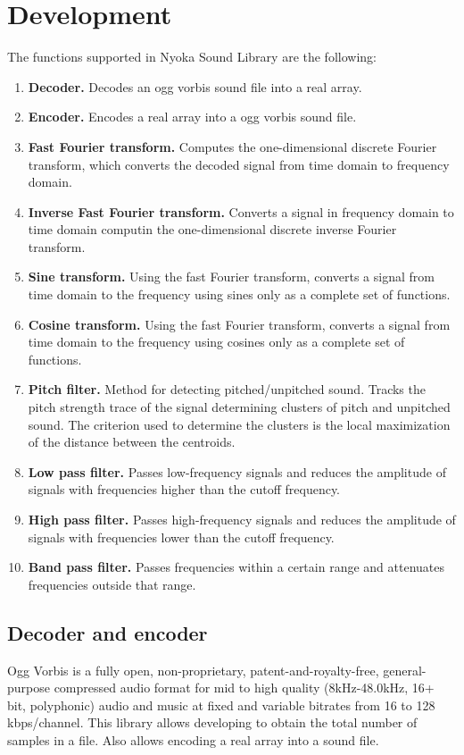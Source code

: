 \documentclass[letterpaper]{article}
\begin{document}
\section{Development}
The functions supported in Nyoka Sound Library are the following:
\begin{enumerate}
\item \textbf{Decoder.} Decodes an ogg vorbis sound file into a real array.
\item \textbf{Encoder.} Encodes a real array into a ogg vorbis sound file.
\item \textbf{Fast Fourier transform.} Computes the one-dimensional discrete Fourier transform, which converts the decoded signal from time domain to frequency domain. 
\item \textbf{Inverse Fast Fourier transform.} Converts a signal in frequency domain to time domain computin the one-dimensional discrete inverse Fourier transform.
\item \textbf{Sine transform.} Using the fast Fourier transform, converts a signal from time domain to the frequency using sines only as a complete set of functions.
\item \textbf{Cosine transform.} Using the fast Fourier transform, converts a signal from time domain to the frequency using cosines only as a complete set of functions.
\item \textbf{Pitch filter.} Method for detecting pitched/unpitched sound. Tracks the pitch strength trace of the signal determining clusters of pitch and unpitched sound. The criterion used to determine the clusters is the
local maximization of the distance between the centroids.
\item \textbf{Low pass filter.} Passes low-frequency signals and reduces the amplitude of signals with frequencies higher than the cutoff frequency.
\item \textbf{High pass filter.} Passes high-frequency signals and reduces the amplitude of signals with frequencies lower than the cutoff frequency. 
\item \textbf{Band pass filter.} Passes frequencies within a certain range and attenuates frequencies outside that range.
\end{enumerate}

\subsection{Decoder and encoder}
Ogg Vorbis is a fully open, non-proprietary, patent-and-royalty-free, general-purpose compressed audio format for mid to high quality (8kHz-48.0kHz, 16+ bit, polyphonic) audio and music at fixed and variable bitrates from 16 to 128 kbps/channel. This library allows developing to obtain the total number of samples in a file. Also allows encoding a real array into a sound file. 
\end{document}
